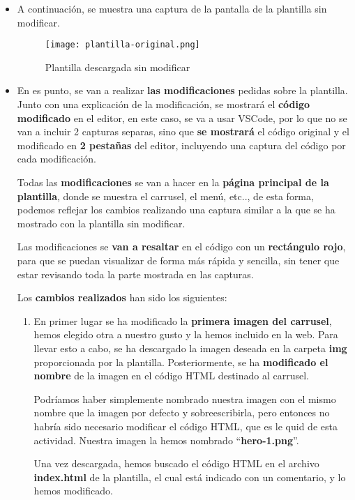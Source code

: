 \begin{itemize}
    \item A continuación, se muestra una captura de la pantalla de la plantilla sin modificar.

    \begin{figure}[H]
        \centering
        \texttt{[image: plantilla-original.png]}
        \caption{Plantilla descargada sin modificar}
    \end{figure}

    \item En es punto, se van a realizar \textbf{las modificaciones} pedidas sobre la plantilla. Junto con una explicación de la modificación, se mostrará el \textbf{código modificado} en el editor, en este caso, se va a usar VSCode, por lo que no se van a incluir 2 capturas separas, sino que \textbf{se mostrará} el código original y el modificado en \textbf{2 pestañas} del editor, incluyendo una captura del código por cada modificación.

    Todas las \textbf{modificaciones} se van a hacer en la \textbf{página principal de la plantilla}, donde se muestra el carrusel, el menú, etc.., de esta forma, podemos reflejar los cambios realizando una captura similar a la que se ha mostrado con la plantilla sin modificar.

    Las modificaciones se \textbf{van a resaltar} en el código con un \textbf{rectángulo rojo}, para que se puedan visualizar de forma más rápida y sencilla, sin tener que estar revisando toda la parte mostrada en las capturas.

    Los \textbf{cambios realizados} han sido los siguientes:

    \begin{enumerate}
        \item En primer lugar se ha modificado la \textbf{primera imagen del carrusel}, hemos elegido otra a nuestro gusto y la hemos incluido en la web. Para llevar esto a cabo, se ha descargado la imagen deseada en la carpeta \textbf{img} proporcionada por la plantilla. Posteriormente, se ha \textbf{modificado el nombre} de la imagen en el código HTML destinado al carrusel.

        Podríamos haber simplemente nombrado nuestra imagen con el mismo nombre que la imagen por defecto y sobreescribirla, pero entonces no habría sido necesario modificar el código HTML, que es le quid de esta actividad. Nuestra imagen la hemos nombrado ``\textbf{hero-1.png}''.

        Una vez descargada, hemos buscado el código HTML en el archivo \textbf{index.html} de la plantilla, el cual está indicado con un comentario, y lo hemos modificado.
    \end{enumerate}
\end{itemize}






%
%

